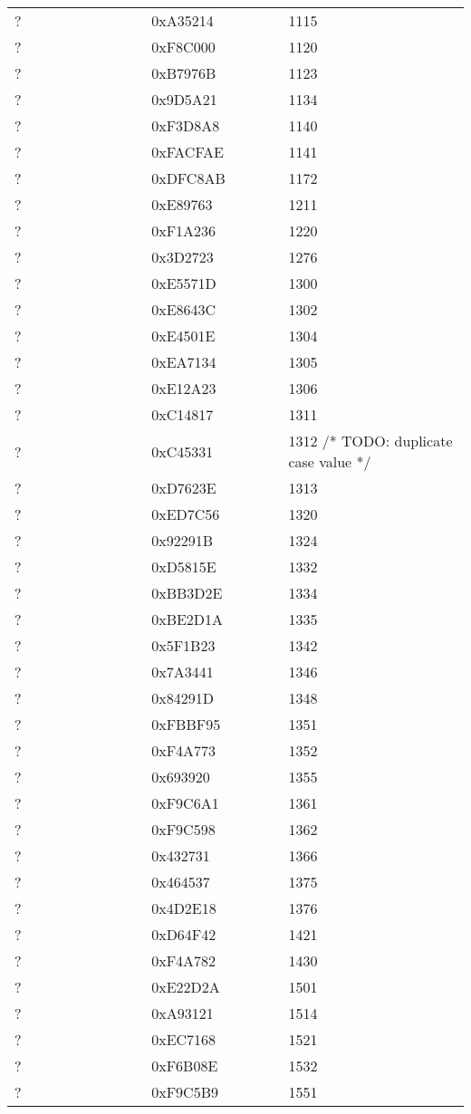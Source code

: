 \begin{longtable}{p{0.3\linewidth} p{0.3\linewidth} p{0.4\linewidth}}
? &  0xA35214 &  1115\\
? &  0xF8C000 &  1120\\
? &  0xB7976B &  1123\\
? &  0x9D5A21 &  1134\\
? &  0xF3D8A8 &  1140\\
? &  0xFACFAE &  1141\\
? &  0xDFC8AB &  1172\\
? &  0xE89763 &  1211\\
? &  0xF1A236 &  1220\\
? &  0x3D2723 &  1276\\
? &  0xE5571D &  1300\\
? &  0xE8643C &  1302\\
? &  0xE4501E &  1304\\
? &  0xEA7134 &  1305\\
? &  0xE12A23 &  1306\\
? &  0xC14817 &  1311\\
? &  0xC45331 &  1312 /* TODO: duplicate case value */\\
? &  0xD7623E &  1313\\
? &  0xED7C56 &  1320\\
? &  0x92291B &  1324\\
? &  0xD5815E &  1332\\
? &  0xBB3D2E &  1334\\
? &  0xBE2D1A &  1335\\
? &  0x5F1B23 &  1342\\
? &  0x7A3441 &  1346\\
? &  0x84291D &  1348\\
? &  0xFBBF95 &  1351\\
? &  0xF4A773 &  1352\\
? &  0x693920 &  1355\\
? &  0xF9C6A1 &  1361\\
? &  0xF9C598 &  1362\\
? &  0x432731 &  1366\\
? &  0x464537 &  1375\\
? &  0x4D2E18 &  1376\\
? &  0xD64F42 &  1421\\
? &  0xF4A782 &  1430\\
? &  0xE22D2A &  1501\\
? &  0xA93121 &  1514\\
? &  0xEC7168 &  1521\\
? &  0xF6B08E &  1532\\
? &  0xF9C5B9 &  1551\\

\end{longtable}
